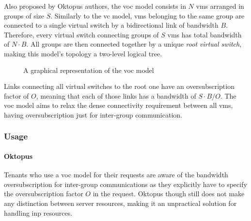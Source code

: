 
Also proposed by Oktopus \cite{oktopus} authors, the \gls{voc} model consists in $N$ \glspl{vm} arranged in groups of size $S$.
Similarly to the \gls{vc} model, \glspl{vm} belonging to the same group are connected to a single virtual switch by a bidirectional link of bandwidth $B$.
Therefore, every virtual switch connecting groups of $S$ \glspl{vm} has total bandwidth of $N \cdot B$.
All groups are then connected together by a unique \textit{root virtual switch}, making this model's topology a two-level logical tree.

\begin{figure}[!htb]
    \centering
    \usebox{\vocfigure}
    \caption{A graphical representation of the \gls{voc} model}
\end{figure}

Links connecting all virtual switches to the root one have an oversubscription factor of $O$, meaning that each of those links has a bandwidth of $S \cdot B / O$.
The \gls{voc} model aims to relax the dense connectivity requirement between all \glspl{vm}, having oversubscription just for inter-group communication.

\subsubsection{Usage}
\paragraph{Oktopus \texorpdfstring{\cite{oktopus}}{}}
Tenants who use a \gls{voc} model for their requests are aware of the bandwidth oversubscription for inter-group communications as they explicitly have to specify the oversubscription factor $O$ in the request.
Oktopus \cite{oktopus} though still does not make any distinction between server resources, making it an unpractical solution for handling \gls{inp} resources.